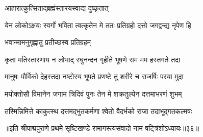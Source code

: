 
\onelineshloka
{आहारात्कुत्सिताद्ब्रह्मंस्तारयस्वाद्य दुष्कृतात्}%

\twolineshloka
{येन लोकोऽक्षयः स्वर्गो भविता त्वत्कृतेन मे}
{ततः प्रतिग्रहो दत्तो जगद्वन्द्य नृपेण हि}%


\onelineshloka
{भवान्मामनुगृह्णातु प्रतीच्छस्व प्रतिग्रहम्}%

\twolineshloka
{कृता मतिस्तारणाय न लोभाद् रघुनन्दन}
{गृहीते भूषणे राम मम हस्तगते तदा}%

\twolineshloka
{मानुषः पौर्विको देहस्तदा नष्टोस्य भूपते}
{प्रणष्टे तु शरीरे च राजर्षिः परया मुदा}%

\twolineshloka
{मयोक्तोसौ विमानेन जगाम त्रिदिवं पुनः}
{तेन मे शक्रतुल्येन दत्तमाभरणं शुभम्}%

\twolineshloka
{तस्मिन्निमित्ते काकुत्स्थ दत्तमद्भुतकर्मणा}
{श्वेतो वैदर्भको राजा तदाभूद्गतकल्मषः}%

{॥इति श्रीपाद्मपुराणे प्रथमे सृष्टिखण्डे रामागस्त्यसंवादो नाम षट्त्रिंशोऽध्यायः॥३६॥}
